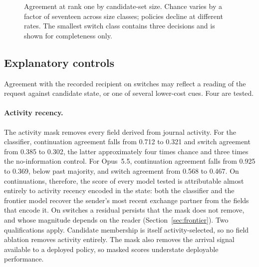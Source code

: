 \documentclass[11pt]{article}
\theoremstyle{definition}
\begin{document}
\begin{figure}[t]
{}
\caption{Agreement at rank one by candidate-set size. Chance varies by a factor of seventeen across size classes; policies decline at different rates. The smallest switch class contains three decisions and is shown for completeness only.}
\label{fig:size}
\end{figure}

\subsection{Explanatory controls}
\label{sec:controls}

Agreement with the recorded recipient on switches may reflect a reading of the request against candidate state, or one of several lower-cost cues. Four are tested.

\paragraph{Activity recency.}
The activity mask removes every field derived from journal activity. For the classifier, continuation agreement falls from 0.712 to 0.321 and switch agreement from 0.385 to 0.302, the latter approximately four times chance and three times the no-information control. For Opus~5.5, continuation agreement falls from 0.925 to 0.369, below past majority, and switch agreement from 0.568 to 0.467. On continuations, therefore, the score of every model tested is attributable almost entirely to activity recency encoded in the state: both the classifier and the frontier model recover the sender's most recent exchange partner from the fields that encode it. On switches a residual persists that the mask does not remove, and whose magnitude depends on the reader (Section~\ref{sec:frontier}). Two qualifications apply. Candidate membership is itself activity-selected, so no field ablation removes activity entirely. The mask also removes the arrival signal available to a deployed policy, so masked scores understate deployable performance.
\end{document}
